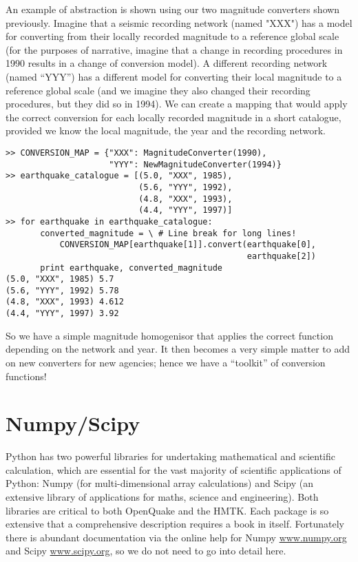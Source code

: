 An example of abstraction is shown using our two magnitude converters shown previously. Imagine that a seismic recording network (named "XXX") has a model for converting from their locally recorded magnitude to a reference global scale (for the purposes of narrative, imagine that a change in recording procedures in 1990 results in a change of conversion model). A different recording network (named ``YYY'') has a different model for converting their local magnitude to a reference global scale (and we imagine they also changed their recording procedures, but they did so in 1994). We can create a mapping that would apply the correct conversion for each locally recorded magnitude in a short catalogue, provided we know the local magnitude, the year and the recording network.

\begin{lstlisting}[frame=single]
>> CONVERSION_MAP = {"XXX": MagnitudeConverter(1990),
                     "YYY": NewMagnitudeConverter(1994)}
>> earthquake_catalogue = [(5.0, "XXX", 1985),
                           (5.6, "YYY", 1992),
                           (4.8, "XXX", 1993),
                           (4.4, "YYY", 1997)]
>> for earthquake in earthquake_catalogue:
       converted_magnitude = \ # Line break for long lines!
           CONVERSION_MAP[earthquake[1]].convert(earthquake[0],
                                                 earthquake[2])
       print earthquake, converted_magnitude
(5.0, "XXX", 1985) 5.7
(5.6, "YYY", 1992) 5.78
(4.8, "XXX", 1993) 4.612
(4.4, "YYY", 1997) 3.92
\end{lstlisting}

So we have a simple magnitude homogenisor that applies the correct function depending on the network and year. It then becomes a very simple matter to add on new converters for new agencies; hence we have a ``toolkit'' of conversion functions!

\section{Numpy/Scipy}

Python has two powerful libraries for undertaking mathematical and scientific calculation, which are essential for the vast majority of scientific applications of Python: Numpy (for multi-dimensional array calculations) and Scipy (an extensive library of applications for maths, science and engineering). Both libraries are critical to both OpenQuake and the HMTK. Each package is so extensive that a comprehensive description requires a book in itself. Fortunately there is abundant documentation via the online help for Numpy \href{www.numpy.org}{www.numpy.org} and Scipy \href{www.scipy.org}{www.scipy.org}, so we do not need to go into detail here. 

